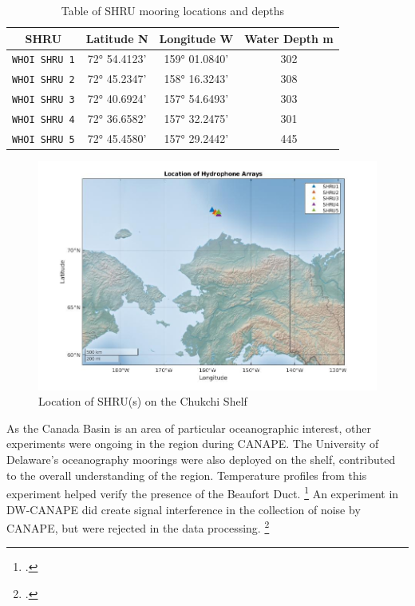 \begin{table}
  \centering
  \begin{tabular}{|| c c c c||}
    \toprule
    \textbf{SHRU}  & \textbf{Latitude N}  & \textbf{Longitude W}  & \textbf{Water Depth m}\\
    \midrule
      \texttt{WHOI SHRU 1}  & 72° 54.4123’ & 159° 01.0840’ & 302 \\
      \texttt{WHOI SHRU 2}  & 72° 45.2347’ & 158° 16.3243’ & 308 \\
      \texttt{WHOI SHRU 3}  & 72° 40.6924’ & 157° 54.6493’ & 303 \\
      \texttt{WHOI SHRU 4}  & 72° 36.6582’ & 157° 32.2475’ & 301 \\
      \texttt{WHOI SHRU 5}  & 72° 45.4580’ & 157° 29.2442’ & 445 \\
    \bottomrule
  \end{tabular}
  \caption{%
    Table of SHRU mooring locations and depths
  }
  \label{table_location}
\end{table}

\begin{figure}[ht]
\centering
\includegraphics[scale=0.5]{Figures/west_bigmap.jpg}
\caption{Location of SHRU(s) on the Chukchi Shelf}
\label{fig_location}
\end{figure}


As the Canada Basin is an area of particular oceanographic interest, other experiments were ongoing in the region during CANAPE. The University of Delaware's oceanography moorings were also deployed on the shelf, contributed to the overall understanding of the region. Temperature profiles from this experiment helped verify the presence of the Beaufort Duct. \footcite[]{ballard2020temporal} An experiment in DW-CANAPE did create signal interference in the collection of noise by CANAPE, but were rejected in the data processing. \footcite[]{Bonnel2021} 


